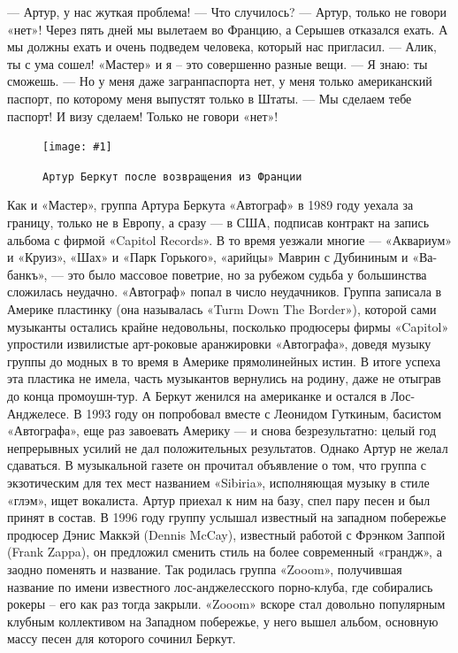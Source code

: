 \documentclass[10pt, twoside]{book}
\newcommand{\myincludegraphics}[1]{\texttt{[image: \#1]}}
\begin{document}
— Артур, у нас жуткая проблема!
— Что случилось?
— Артур, только не говори «нет»! Через пять дней мы вылетаем во Францию, а Серышев отказался ехать. А мы должны ехать и
очень подведем человека, который нас пригласил.
— Алик, ты с ума сошел! «Мастер» и я – это совершенно разные вещи.
— Я знаю: ты сможешь.
— Но у меня даже загранпаспорта нет, у меня только американский паспорт, по которому меня выпустят только в Штаты.
— Мы сделаем тебе паспорт! И визу сделаем! Только не говори «нет»!

\begin{figure}[h]
    \centering
    \myincludegraphics{Image30}
    \caption{\texttt{Артур Беркут после возвращения из Франции}}
\end{figure}

Как и «Мастер», группа Артура Беркута «Автограф» в 1989 году уехала за границу, только не в Европу, а сразу — в США,
подписав контракт на запись альбома с фирмой «Capitol Records». В то время уезжали многие — «Аквариум» и «Круиз», «Шах»
и «Парк Горького», «арийцы» Маврин с Дубининым и «Ва-банкъ», — это было массовое поветрие, но за рубежом судьба у
большинства сложилась неудачно. «Автограф» попал в число неудачников. Группа записала в Америке пластинку (она
называлась «Turm Down The Border»), которой сами музыканты остались крайне недовольны, посколько продюсеры фирмы
«Capitol» упростили извилистые арт-роковые аранжировки «Автографа», доведя музыку группы до модных в то время в Америке
прямолинейных истин. В итоге успеха эта пластика не имела, часть музыкантов вернулись на родину, даже не отыграв до
конца промоушн-тур. А Беркут женился на американке и остался в Лос-Анджелесе. В 1993 году он попробовал вместе с
Леонидом Гуткиным, басистом «Автографа», еще раз завоевать Америку — и снова безрезультатно: целый год непрерывных
усилий не дал положительных результатов. Однако Артур не желал сдаваться. В музыкальной газете он прочитал объявление о
том, что группа с экзотическим для тех мест названием «Sibiria», исполняющая музыку в стиле «глэм», ищет вокалиста.
Артур приехал к ним на базу, спел пару песен и был принят в состав. В 1996 году группу услышал известный на западном
побережье продюсер Дэнис Маккэй (Dennis McCay), известный работой с Фрэнком Заппой (Frank Zappa), он предложил сменить
стиль на более современный «грандж», а заодно поменять и название. Так родилась группа «Zooom», получившая название по
имени известного лос-анджелесского порно-клуба, где собирались рокеры – его как раз тогда закрыли. «Zooom» вскоре стал
довольно популярным клубным коллективом на Западном побережье, у него вышел альбом, основную массу песен для которого
сочинил Беркут.
\end{document}

